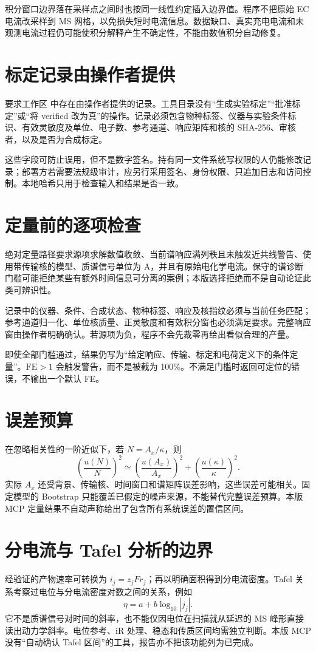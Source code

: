 积分窗口边界落在采样点之间时也按同一线性约定插入边界值。程序不把原始 EC 电流改采样到 MS 网格，以免损失短时电流信息。数据缺口、真实充电电流和未观测电流过程仍可能使积分解释产生不确定性，不能由数值积分自动修复。

\section{标定记录由操作者提供}
 要求工作区  中存在由操作者提供的记录。工具目录没有“生成实验标定”“批准标定”或“将 verified 改为真”的操作。记录必须包含物种标签、仪器与实验条件标识、有效灵敏度及单位、电子数、参考通道、响应矩阵和核的 SHA-256、审核者，以及是否为合成标定。

这些字段可防止误用，但不是数字签名。持有同一文件系统写权限的人仍能修改记录；部署方若需要法规级审计，应另行采用签名、身份权限、只追加日志和访问控制。本地哈希只用于检查输入和结果是否一致。

\section{定量前的逐项检查}
绝对定量路径要求源项求解数值收敛、当前谱响应满列秩且未触发近共线警告、使用带传输核的模型、质谱信号单位为 A，并且有原始电化学电流。保守的谱诊断门槛可能拒绝某些有额外时间信息可分离的案例；本版选择拒绝而不是自动论证此类可辨识性。

记录中的仪器、条件、合成状态、物种标签、响应及核指纹必须与当前任务匹配；参考通道归一化、单位核质量、正灵敏度和有效积分窗也必须满足要求。完整响应窗由操作者明确确认。若源项为负，程序不会先裁零再给出看似合理的产量。

即使全部门槛通过，结果仍写为“给定响应、传输、标定和电荷定义下的条件定量”。$\mathrm{FE}>1$ 会触发警告，而不是被截为 100\%。不满足门槛时返回可定位的错误，不输出一个默认 FE。

\section{误差预算}
在忽略相关性的一阶近似下，若 $N=A_x/\kappa$，则
\begin{equation}
\left(\frac{u(N)}N\right)^2\simeq
\left(\frac{u(A_x)}{A_x}\right)^2+
\left(\frac{u(\kappa)}\kappa\right)^2.
\end{equation}
实际 $A_x$ 还受背景、传输核、时间窗口和谱矩阵误差影响，这些误差可能相关。固定模型的 Bootstrap 只能覆盖已假定的噪声来源，不能替代完整误差预算。本版 MCP 定量结果不自动声称给出了包含所有系统误差的置信区间。

\section{分电流与 Tafel 分析的边界}
经验证的产物速率可转换为 $i_j=z_jFr_j$；再以明确面积得到分电流密度。Tafel 关系考察过电位与分电流密度对数之间的关系，例如
\begin{equation}
\eta=a+b\log_{10}|j_j|.
\end{equation}
它不是质谱信号对时间的斜率，也不能仅因电位在扫描就从延迟的 MS 峰形直接读出动力学斜率。电位参考、iR 处理、稳态和传质区间均需独立判断。本版 MCP 没有“自动确认 Tafel 区间”的工具，报告亦不把该功能列为已完成。
